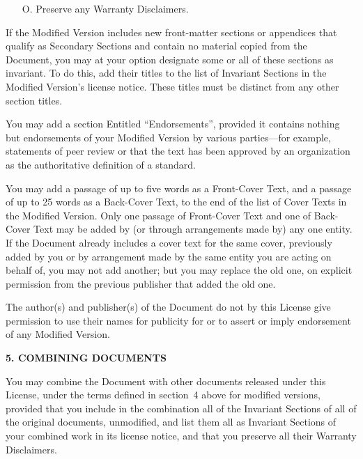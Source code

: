 \documentclass[10pt,a4paper,ngerman,titlepage,tocindentauto]{article}
\begin{document}
\begin{multicols}{3}
{\begin{itemize}
				\item[O.]
					Preserve any Warranty Disclaimers.
				\end{itemize}

				If the Modified Version includes new front-matter sections or
				appendices that qualify as Secondary Sections and contain no material
				copied from the Document, you may at your option designate some or all
				of these sections as invariant.  To do this, add their titles to the
				list of Invariant Sections in the Modified Version's license notice.
				These titles must be distinct from any other section titles.

				You may add a section Entitled ``Endorsements'', provided it contains
				nothing but endorsements of your Modified Version by various
				parties---for example, statements of peer review or that the text has
				been approved by an organization as the authoritative definition of a
				standard.

				You may add a passage of up to five words as a Front-Cover Text, and a
				passage of up to 25 words as a Back-Cover Text, to the end of the list
				of Cover Texts in the Modified Version.  Only one passage of
				Front-Cover Text and one of Back-Cover Text may be added by (or
				through arrangements made by) any one entity.  If the Document already
				includes a cover text for the same cover, previously added by you or
				by arrangement made by the same entity you are acting on behalf of,
				you may not add another; but you may replace the old one, on explicit
				permission from the previous publisher that added the old one.

				The author(s) and publisher(s) of the Document do not by this License
				give permission to use their names for publicity for or to assert or
				imply endorsement of any Modified Version.


				\begin{center}
				{\bf 5. COMBINING DOCUMENTS\par}
				\end{center}

				You may combine the Document with other documents released under this
				License, under the terms defined in section~4 above for modified
				versions, provided that you include in the combination all of the
				Invariant Sections of all of the original documents, unmodified, and
				list them all as Invariant Sections of your combined work in its
				license notice, and that you preserve all their Warranty Disclaimers.

}
\end{multicols}
\end{document}
